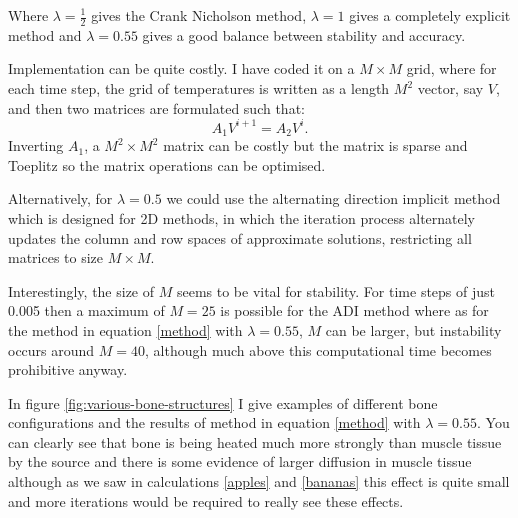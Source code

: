 \documentclass[11pt]{article} %
\begin{document}
Where $ \lambda =\frac{1}{2} $ gives the Crank Nicholson method, $ \lambda =1 $ gives a completely explicit method and $ \lambda=0.55 $ gives a good balance between stability and accuracy. 

Implementation can be quite costly. I have coded it  on a $ M\times M  $ grid, where for each time step, the grid of temperatures is written as a length $ M^2 $ vector, say $V$,  and then two matrices are formulated such that: $$ A_1 V^{i+1}=A_2 V^{i}.$$ Inverting $A_1$, a $M^2\times M^2$ matrix can be costly  but the matrix is sparse and Toeplitz so the matrix operations can be optimised. 

Alternatively, for $\lambda=0.5$ we could use the alternating direction implicit method which is designed for 2D methods, in  which the iteration process alternately updates the column and row spaces of approximate solutions, restricting all matrices to size $M \times M$.

Interestingly, the size of $M$ seems to be vital for stability. For time steps of just 0.005 then a maximum of $M=25$ is possible for the ADI method where as for the method in equation \ref{method} with $ \lambda=0.55 $,  $M$ can be larger, but instability occurs around $ M=40 $, although much above this computational time becomes prohibitive anyway. 

In figure \ref{fig:various-bone-structures}  I give examples of different bone configurations and the results of method in equation  \ref{method} with $ \lambda=0.55 $. You can clearly see that bone is being heated much more strongly than muscle tissue by the source and there is some evidence of larger diffusion in muscle tissue although as we saw in calculations \ref{apples} and \ref{bananas} this effect is quite small and more iterations would be required to really see these effects. 
\end{document}
